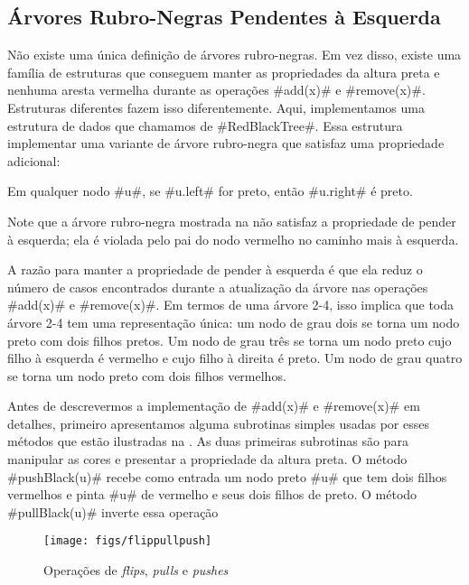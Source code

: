 \subsection{Árvores Rubro-Negras Pendentes à Esquerda}

%
%
Não existe uma única definição de 
árvores rubro-negras. Em vez disso, existe uma família
de estruturas que conseguem manter as propriedades da altura preta
e nenhuma aresta vermelha 
durante as operações #add(x)# e #remove(x)#. Estruturas diferentes fazem isso diferentemente. 
Aqui, implementamos uma estrutura de dados que chamamos de 
#RedBlackTree#.
%
Essa estrutura implementar uma variante de árvore rubro-negra que satisfaz
uma propriedade adicional:
\begin{prp}
  Em qualquer nodo #u#, se #u.left# for preto, então #u.right# é preto. 
\end{prp}
Note que a árvore rubro-negra mostrada na 
  não satisfaz a propriedade de pender 
à esquerda; 
ela é violada pelo pai do nodo vermelho no caminho mais à esquerda.

A razão para manter a propriedade de pender à esquerda é que ela reduz
o número de casos encontrados durante a atualização da árvore nas operações
#add(x)#
e #remove(x)#.  Em termos de uma árvore 2-4, isso implica que toda árvore 2-4 tem uma representação única: um nodo de grau dois se torna um nodo preto com dois filhos pretos.
Um nodo de grau três se torna um nodo preto cujo filho à esquerda é vermelho 
e cujo filho à direita é preto.
Um nodo de grau quatro se torna um nodo preto com dois filhos vermelhos.

Antes de descrevermos a implementação de 
 #add(x)# e #remove(x)# em detalhes, primeiro apresentamos alguma subrotinas
 simples usadas por esses métodos que estão ilustradas na 
 .  As duas primeiras subrotinas são para manipular
 as cores e presentar a propriedade da altura preta.
 O método 
#pushBlack(u)# recebe como entrada um nodo preto #u#
que tem dois filhos vermelhos e pinta #u# de vermelho e seus dois filhos de preto.
O método 
#pullBlack(u)# inverte essa operação

\begin{figure}
  \begin{center}
    \texttt{[image: figs/flippullpush]}
  \end{center}
  \caption{Operações de \emph{flips}, \emph{pulls} e \emph{pushes}}
\end{figure}

